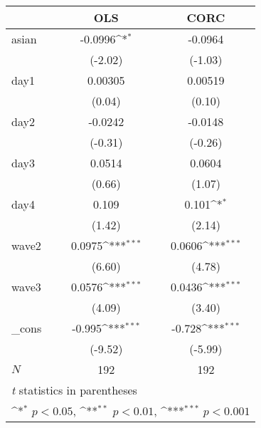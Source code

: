 {
\def\sym#1{\ifmmode^{#1}\else\(^{#1}\)\fi}
\begin{tabular}{l*{2}{c}}
\hline\hline
            &\multicolumn{1}{c}{OLS}&\multicolumn{1}{c}{CORC}\\
\hline
asian       &     -0.0996\sym{*}  &     -0.0964         \\
            &     (-2.02)         &     (-1.03)         \\
[1em]
day1        &     0.00305         &     0.00519         \\
            &      (0.04)         &      (0.10)         \\
[1em]
day2        &     -0.0242         &     -0.0148         \\
            &     (-0.31)         &     (-0.26)         \\
[1em]
day3        &      0.0514         &      0.0604         \\
            &      (0.66)         &      (1.07)         \\
[1em]
day4        &       0.109         &       0.101\sym{*}  \\
            &      (1.42)         &      (2.14)         \\
[1em]
wave2       &      0.0975\sym{***}&      0.0606\sym{***}\\
            &      (6.60)         &      (4.78)         \\
[1em]
wave3       &      0.0576\sym{***}&      0.0436\sym{***}\\
            &      (4.09)         &      (3.40)         \\
[1em]
\_cons      &      -0.995\sym{***}&      -0.728\sym{***}\\
            &     (-9.52)         &     (-5.99)         \\
\hline
\(N\)       &         192         &         192         \\
\hline\hline
\multicolumn{3}{l}{\footnotesize \textit{t} statistics in parentheses}\\
\multicolumn{3}{l}{\footnotesize \sym{*} \(p<0.05\), \sym{**} \(p<0.01\), \sym{***} \(p<0.001\)}\\
\end{tabular}
}
